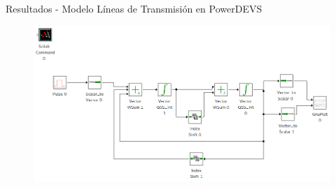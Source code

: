 \documentclass[10pt,presentation]{beamer}
\begin{document}
\begin{frame}{Resultados - Modelo Líneas de Transmisión en PowerDEVS}
\begin{figure}[H]
 \includegraphics[width=\linewidth]{lclines}
\end{figure}
\end{frame}
\end{document}
